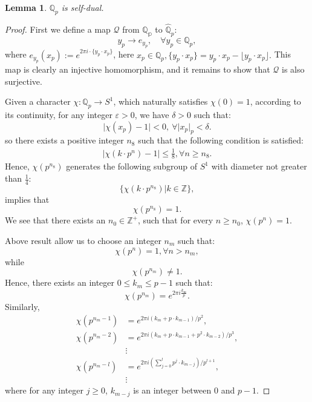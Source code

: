 \documentclass[11pt]{article}
\newtheorem{lemma}[theorem]{Lemma}     %
\theoremstyle{remark}
\begin{document}
\begin{lemma}\label{Q_pdual}
    \(\mathbb{Q}_p\) is self-dual.
\end{lemma}
\begin{proof}
First we define a map $\mathcal{Q}$ from $\mathbb{Q_p}$ to $\hat{\mathbb{Q}}_p$:
\begin{equation}
    y_p\rightarrow e_{y_p}, \quad \forall y_p\in \mathbb{Q}_p,
\end{equation}
where \(e_{y_p}(x_p):=e^{2\pi i\cdot \{y_p\cdot x_p\}}\), here $x_p\in \mathbb{Q}_p, \{y_p\cdot x_p\}=y_p\cdot x_p-\lfloor y_p\cdot x_p\rfloor.$ This map is clearly an injective homomorphism, and it remains to show that $\mathcal{Q}$ is also  surjective.

Given a character \(\chi: \mathbb{Q}_p \to S^1\), which naturally satisfies \(\chi(0) = 1\), according to its continuity, for any integer \(\varepsilon >0\), we have \(\delta>0 \) such that: 
\begin{equation}\label{lim}
    \lvert\chi(x_p)-1\rvert<0,\ \forall \lvert x_p\rvert_p<\delta.
\end{equation}
so there exists a positive integer \( n_{8}\) such that the following condition is satisfied:
\begin{align}
    \lvert\chi(k\cdot p^n)-1\rvert  \leq \frac{1}{8}, \forall n\geq n_8.
\end{align}
Hence, $\chi(p^{n_8})$ generates the following subgroup of \(S^1\) with diameter not greater than $\frac{1}{4}$:
\[
\{\chi(k\cdot p^{n_8})|k\in \mathbb{Z}\},
\]
implies that
\[
\chi( p^{n_8})=1.
\] 
We see that there exists an \(n_0\in \mathbb{Z}^+\), such that for every \(n\geq n_0\),  \(\chi (p^n)=1\).

Above result allow us to choose an integer $n_m$ such that:
\begin{equation}
    \chi(p^{n})= 1, \forall n>n_m, 
\end{equation}
while
\[
\chi(p^{n_m})\neq 1.
\]
Hence, there exists an integer $0\leq k_m\leq p-1$ such that:
\begin{equation}
    \chi(p^{n_m})=e^{2\pi i\frac{k_m}{p} }.
\end{equation}
Similarly,
\begin{align*}
    \chi(p^{n_m-1})&=e^{2\pi i (k_m+p\cdot k_{m-1})/{p^2}},\\
    \chi(p^{n_m-2})&=e^{2\pi i(k_m+p\cdot k_{m-1}+p^2\cdot k_{m-2})/{p^3}},\\
    &\vdots\\
    \chi(p^{n_m-l})&=e^{2\pi i(\sum_{j=0}^lp^j\cdot k_{m-j})/{p^{l+1}}},\\
    &\vdots
\end{align*}
where for any integer $j\geq 0$, $k_{m-j}$ is an integer between \(0\) and \(p-1\).


\end{proof}
\end{document}
